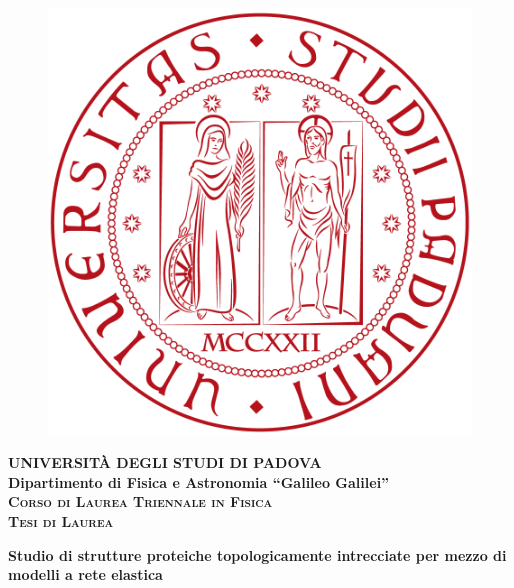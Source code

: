 \begin{titlepage}
\vspace{5mm}
\begin{figure}[hbtp]
\centering
\includegraphics[scale=.13]{UNIPD.png}
\end{figure}
\vspace{5mm}
\begin{center}
{{\huge{\textsc{\bf UNIVERSIT\`A DEGLI STUDI DI PADOVA}}}\\}
\vspace{5mm}
{\Large{\bf Dipartimento di Fisica e Astronomia ``Galileo Galilei''}} \\
\vspace{5mm}
{\Large{\textsc{\bf Corso di Laurea Triennale in Fisica}}}\\
\vspace{20mm}
{\Large{\textsc{\bf Tesi di Laurea}}}\\
\vspace{30mm}
\begin{spacing}{3}
{\LARGE \textbf{Studio di strutture proteiche topologicamente intrecciate per mezzo di modelli a rete elastica}}\\
\end{spacing}
\vspace{8mm}
\end{center}


\end{titlepage}
